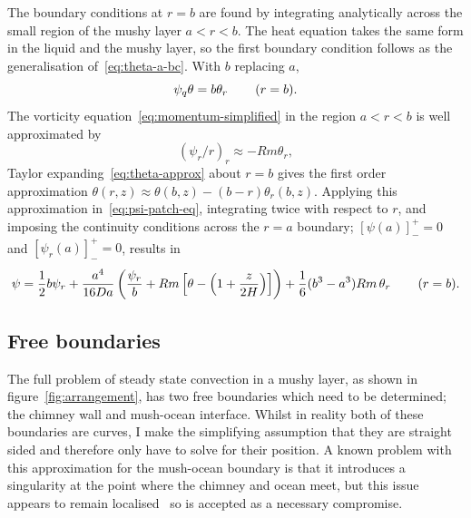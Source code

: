 \documentclass[11pt,twocolumn]{article}
\begin{document}
The boundary conditions at $r=b$ are found by integrating analytically across the small region of the mushy layer $a < r < b$. The heat equation takes the same form in the liquid and the mushy layer, so the first boundary condition follows as the generalisation of~\eqref{eq:theta-a-bc}. With $b$ replacing $a$,
\begin{equation}
\psi_q \theta = b \theta_r  \hspace{5ex} (r=b).
\end{equation}
The vorticity equation~\eqref{eq:momentum-simplified} in the region $a < r < b$ is well approximated by
\begin{equation}
\label{eq:psi-patch-eq}
(\psi_r/r)_r \approx -Rm \theta_r,
\end{equation}
Taylor expanding~\eqref{eq:theta-approx} about $r=b$ gives the first order approximation $\theta(r, z) \approx \theta(b, z) - (b-r) \theta_r(b, z)$. Applying this approximation in~\eqref{eq:psi-patch-eq}, integrating twice with respect to $r$, and imposing the continuity conditions across the $r=a$ boundary; $[\psi(a)]_{-}^{+} = 0$ and $[\psi_r(a)]_-^+ = 0$, results in
\begin{equation}
  \psi = \frac{1}{2} b \psi_r + \frac{a^4}{16 Da} \left(  \frac{\psi_r}{b}  +   Rm \left[ \theta - \left( 1 + \frac{z}{2H} \right) \right]  \right)  + \frac{1}{6} (b^3-a^3) Rm \, \theta_r \hspace{5ex} (r=b).
\end{equation}

\subsection{Free boundaries}
\label{sec:free-boundaries-theory}

The full problem of steady state convection in a mushy layer, as shown in figure~\ref{fig:arrangement}, has two free boundaries which need to be determined; the chimney wall and mush-ocean interface. Whilst in reality both of these boundaries are curves, I make the simplifying assumption that they are straight sided and therefore only have to solve for their position. A known problem with this approximation for the mush-ocean boundary is that it introduces a singularity at the point where the chimney and ocean meet, but this issue appears to remain localised~\citep*{schulze-worster-98} so is accepted as a necessary compromise.
\end{document}
